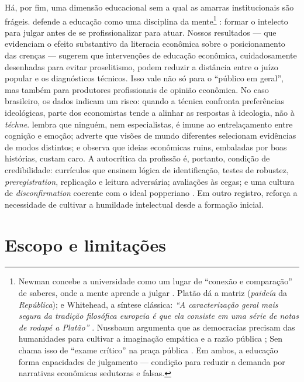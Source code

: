 Há, por fim, uma dimensão educacional sem a qual as amarras institucionais são frágeis.  defende a educação como uma disciplina da mente\footnote{Newman concebe a universidade como um lugar de “conexão e comparação” de saberes, onde a mente aprende a julgar . Platão dá a matriz (\textit{paideía} da \textit{República}); e Whitehead, a síntese clássica: \textit{“A caracterização geral mais segura da tradição filosófica europeia é que ela consiste em uma série de notas de rodapé a Platão”} \cite[p.~39]{whitehead1978process}. Nussbaum argumenta que as democracias precisam das humanidades para cultivar a imaginação empática e a razão pública \cite{nussbaum2010notforprofit}; Sen chama isso de “exame crítico” na praça pública \cite{sen1999development}. Em ambos, a educação forma capacidades de julgamento — condição para reduzir a demanda por narrativas econômicas sedutoras e falsas.}
: formar o intelecto para julgar antes de se profissionalizar para atuar. Nossos resultados — que evidenciam o efeito substantivo da literacia econômica sobre o posicionamento das crenças — sugerem que intervenções de educação econômica, cuidadosamente desenhadas para evitar proselitismo, podem reduzir a distância entre o juízo popular e os diagnósticos técnicos. Isso vale não só para o “público em geral”, mas também para produtores profissionais de opinião econômica. No caso brasileiro, os dados indicam um risco: quando a técnica confronta preferências ideológicas, parte dos economistas tende a alinhar as respostas à ideologia, não à \textit{téchne}.  lembra que ninguém, nem especialistas, é imune ao entrelaçamento entre cognição e emoção;  adverte que visões de mundo diferentes selecionam evidências de modos distintos; e  observa que ideias econômicas ruins, embaladas por boas histórias, custam caro. A autocrítica da profissão é, portanto, condição de credibilidade: currículos que ensinem lógica de identificação, testes de robustez, \textit{preregistration}, replicação e leitura adversária; avaliações às cegas; e uma cultura de \textit{disconfirmation} coerente com o ideal popperiano \cite{popperlogic}. Em outro registro,  reforça a necessidade de cultivar a humildade intelectual desde a formação inicial.


\section{Escopo e limitações}

